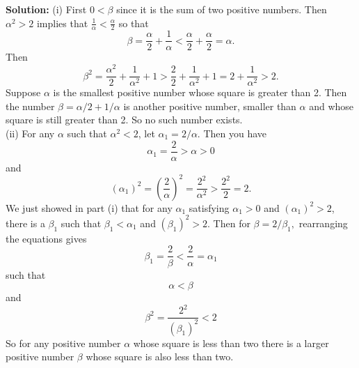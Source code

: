 \documentclass{article}
\newcommand{\solution}[1]{\setlength{\hangindent}{\parindent} \indent\indent \textbf{Solution: }#1\hfill\break}
\begin{document}
\solution{(i) First $0<\beta$ since it is the sum of two positive numbers. Then $\alpha^2 > 2$ implies that $\frac{1}{\alpha} < \frac{\alpha}{2}$ so that $$\beta = \frac{\alpha}{2}+\frac{1}{\alpha} < \frac{\alpha}{2} + \frac{\alpha}{2} = \alpha.$$ Then $$\beta^2 = \frac{\alpha^2}{2} + \frac{1}{\alpha^2} + 1 > \frac{2}{2} + \frac{1}{\alpha^2} + 1 = 2+\frac{1}{\alpha^2} > 2.$$ \indent Suppose $\alpha$ is the smallest positive number whose square is greater than 2. Then the number $\beta = \alpha/2 + 1/\alpha$ is another positive number, smaller than $\alpha$ and whose square is still greater than 2. So no such number exists. \\
\indent (ii) For any $\alpha$ such that $\alpha^2<2$, let $\alpha_1 = 2/\alpha$. Then you have $$\alpha_1 = \frac{2}{\alpha} > \alpha > 0$$ and  $$(\alpha_1)^2 = \left(\frac{2}{\alpha}\right)^2 = \frac{2^2}{\alpha^2} > \frac{2^2}{2} = 2.$$ \indent We just showed in part (i) that for any $\alpha_1$ satisfying $\alpha_1 >0$ and $(\alpha_1)^2>2$, there is a $\beta_1$ such that $\beta_1 < \alpha_1$ and $(\beta_1)^2 > 2$. Then for $\beta = 2/\beta_1,$ rearranging the equations gives $$\beta_1 = \frac{2}{\beta}  <  \frac{2}{\alpha} = \alpha_1$$ such that $$\alpha < \beta$$ and $$\beta^2 = \frac{2^2}{(\beta_1)^2} < 2$$ \indent So for any positive number $\alpha$ whose square is less than two there is a larger positive number $\beta$ whose square is also less than two.} %

\newpage
\end{document}
